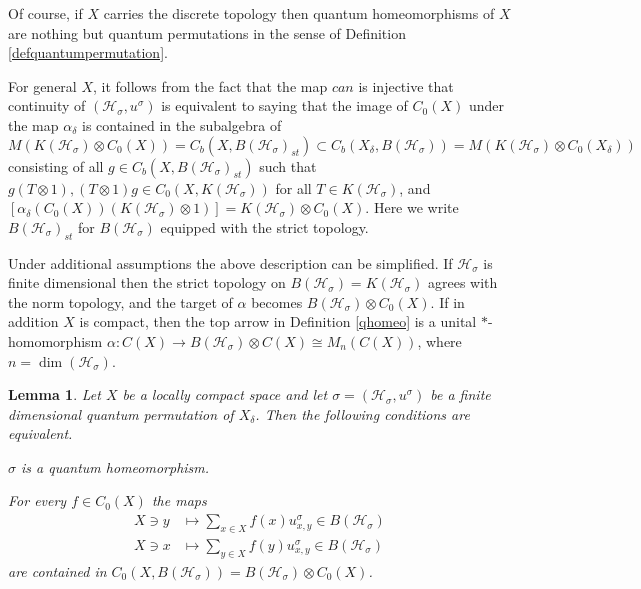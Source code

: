 \documentclass[a4paper]{amsart}
\newcommand*{\Hc}{\mathcal{H}}
\newenvironment{bnum}
{\begin{list}{}
    {\setlength{\labelwidth}{15pt}
     \setlength{\leftmargin}{\labelwidth}
    }
}
{\end{list}}
\numberwithin{equation}{section}
\theoremstyle{change}
\newtheorem{lemma}[theorem]{Lemma}
\begin{document}
Of course, if $ X $ carries the discrete topology then quantum homeomorphisms of $ X $ are nothing but quantum permutations in the sense of Definition \ref{defquantumpermutation}. 

For general $ X $, it follows from the fact that the map $ can $ is injective that continuity of $ (\Hc_\sigma, u^\sigma) $ is equivalent to saying that the image of $ C_0(X) $ under the map $ \alpha_\delta $ is contained in the subalgebra of 
$$ 
M(K(\Hc_\sigma) \otimes C_0(X)) = C_b(X, B(\Hc_\sigma)_{st}) \subset C_b(X_\delta, B(\Hc_\sigma)) = M(K(\Hc_\sigma) \otimes C_0(X_\delta))
$$ 
consisting of all $ g \in C_b(X, B(\Hc_\sigma)_{st}) $ such that $ g(T \otimes 1), (T \otimes 1)g \in C_0(X, K(\Hc_\sigma)) $ for all $ T \in K(\Hc_\sigma) $, and $ [\alpha_\delta(C_0(X))(K(\Hc_\sigma) \otimes 1)] = K(\Hc_\sigma) \otimes C_0(X) $. 
Here we write $ B(\Hc_\sigma)_{st} $ for $ B(\Hc_\sigma) $ equipped with the strict topology. 

Under additional assumptions the above description can be simplified. If $ \Hc_\sigma $ is finite dimensional 
then the strict topology on $ B(\Hc_\sigma) = K(\Hc_\sigma) $ agrees with the norm topology, and the target of $ \alpha $ becomes $ B(\Hc_\sigma) \otimes C_0(X) $. If in addition $ X $ is compact, then the top arrow in Definition \ref{qhomeo}
is a unital $ * $-homomorphism $ \alpha: C(X) \rightarrow B(\Hc_\sigma) \otimes C(X) \cong M_n(C(X)) $, where $ n = \dim(\Hc_\sigma) $. 

\begin{lemma} \label{checkingqhomeo}
Let $ X $ be a locally compact space and let $ \sigma = (\Hc_\sigma, u^\sigma) $ be a finite dimensional quantum permutation of $ X_\delta $. Then the 
following conditions are equivalent. 
\begin{bnum}
\item[a)] $ \sigma $ is a quantum homeomorphism. 
\item[b)] For every $ f \in C_0(X) $ the maps 
\begin{align*} 
X \ni y &\mapsto\sum_{x \in X} f(x) u^\sigma_{x,y} \in B(\Hc_\sigma) \\
X \ni x &\mapsto \sum_{y \in X} f(y) u^\sigma_{x,y} \in B(\Hc_\sigma) 
\end{align*} 
are contained in $ C_0(X, B(\Hc_\sigma)) = B(\Hc_\sigma) \otimes C_0(X) $. 
\end{bnum}
\end{lemma} 
\end{document}
